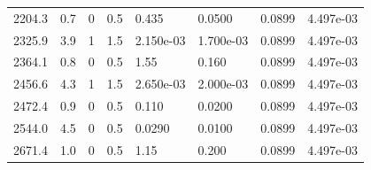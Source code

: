 \documentclass[preview]{standalone}
\begin{document}
{{\begin{tabular}{L{1.2cm}C{1.2cm} C{0.3cm}C{0.5cm} C{1.4cm}C{1.4cm} C{1.4cm}C{1.4cm}}
  2204.3  &   0.7  & 0     & 0.5 &  0.435  & 0.0500  & 0.0899 &  4.497e-03   \\ 
  2325.9  &   3.9  & 1     & 1.5 &  2.150e-03  & 1.700e-03  & 0.0899 &  4.497e-03   \\ 
  2364.1  &   0.8  & 0     & 0.5 &  1.55  & 0.160  & 0.0899 &  4.497e-03   \\ 
  2456.6  &   4.3  & 1     & 1.5 &  2.650e-03  & 2.000e-03  & 0.0899 &  4.497e-03   \\ 
  2472.4  &   0.9  & 0     & 0.5 &  0.110  & 0.0200  & 0.0899 &  4.497e-03   \\ 
  2544.0  &   4.5  & 0     & 0.5 &  0.0290  & 0.0100  & 0.0899 &  4.497e-03   \\ 
  2671.4  &   1.0  & 0     & 0.5 &  1.15  & 0.200  & 0.0899 &  4.497e-03   \\ 
\hline 
\end{tabular} 

}}
\end{document}
